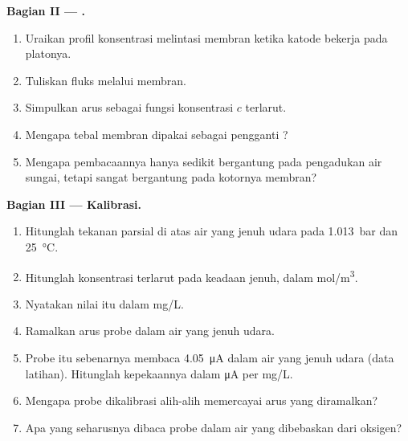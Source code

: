 \begin{problem}
\medskip
\noindent\textbf{Bagian II --- .}
\begin{enumerate}[resume]
  \item Uraikan profil konsentrasi  melintasi membran ketika katode
        bekerja pada platonya.
  \item Tuliskan fluks  melalui membran.
  \item Simpulkan arus sebagai fungsi konsentrasi $c$  terlarut.
  \item Mengapa tebal membran dipakai sebagai pengganti ?
  \item Mengapa pembacaannya hanya sedikit bergantung pada pengadukan air
        sungai, tetapi sangat bergantung pada kotornya membran?
\end{enumerate}

\medskip
\noindent\textbf{Bagian III --- Kalibrasi.}
\begin{enumerate}[resume]
  \item Hitunglah tekanan parsial  di atas air yang jenuh udara pada
        \qty{1.013}{bar} dan \qty{25}{\degreeCelsius}.
  \item Hitunglah konsentrasi  terlarut pada keadaan jenuh, dalam
        \unit{mol/m^3}.
  \item Nyatakan nilai itu dalam \unit{mg/L}.
  \item Ramalkan arus probe dalam air yang jenuh udara.
  \item Probe itu sebenarnya membaca \qty{4.05}{\micro A} dalam air yang
        jenuh udara (data latihan). Hitunglah kepekaannya dalam
        \unit{\micro A} per \unit{mg/L}.
  \item Mengapa probe dikalibrasi alih-alih memercayai arus yang
        diramalkan?
  \item Apa yang seharusnya dibaca probe dalam air yang dibebaskan dari
        oksigen?
\end{enumerate}


\end{problem}

